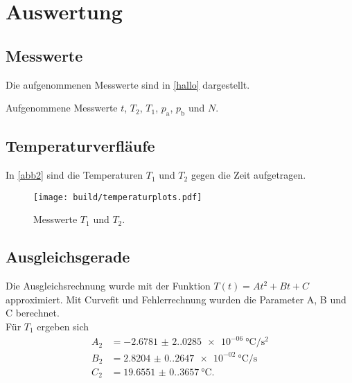 \section{Auswertung}
\label{sec:Auswertung}

\subsection{Messwerte}
Die aufgenommenen Messwerte sind in \autoref{hallo} dargestellt.
\begin{table}
\centering
{}
\caption{Aufgenommene Messwerte $t$, $T_2$, $T_1$, $p_{\text{a}}$, $p_{\text{b}}$ und $N$.}
\label{hallo}
\end{table}
\newpage

\subsection{Temperaturverfläufe}
In \autoref{abb2} sind die Temperaturen $T_1$ und $T_2$ gegen die Zeit aufgetragen.
\begin{figure}[H]
  \centering
  \texttt{[image: build/temperaturplots.pdf]}
  \caption{Messwerte $T_1$ und $T_2$.}
  \label{abb2}
\end{figure}

\subsection{Ausgleichsgerade}
Die Ausgleichsrechnung wurde mit der Funktion $T(t) = A t^2 + B t + C$ approximiert. Mit Curvefit \cite{scipy} und Fehlerrechnung \cite{uncertainties}
wurden die Parameter A, B und C berechnet.\\
Für $T_1$ ergeben sich
\begin{align*}%
  A_2 &= \SI{-2.6781(2.0285)e-06}{\degreeCelsius\per\square\second}\\
  B_2 &= \SI{2.8204(0.2647)e-02}{\degreeCelsius\per\second}\\
  C_2 &= \SI{19.6551(0.3657)}{\degreeCelsius}.
\end{align*}

